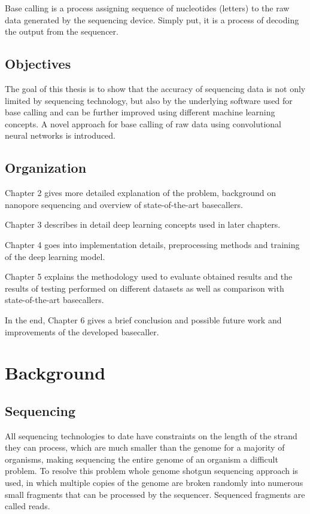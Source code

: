 \documentclass[times, utf8, diplomski, numeric, english]{fer}
\begin{document}
Base calling is a process assigning sequence of nucleotides (letters) to the raw data generated by the sequencing device. Simply put, it is a process of decoding the output from the sequencer.


\section{Objectives}
The goal of this thesis is to show that the accuracy of sequencing data is not only limited by sequencing technology, but also by the underlying software used for base calling and can be further improved using different machine learning concepts. A novel approach for base calling of raw data using convolutional neural networks is introduced.

\section{Organization}
\indent Chapter 2 gives more detailed explanation of the problem, background on nanopore sequencing and overview of state-of-the-art basecallers.

Chapter 3 describes in detail deep learning concepts used in later chapters.

Chapter 4 goes into implementation details, preprocessing methods and training of the deep learning model. 

Chapter 5 explains the methodology used to evaluate obtained results and the results of testing performed on different datasets as well as comparison with state-of-the-art basecallers.

In the end, Chapter 6 gives a brief conclusion and possible future work and improvements of the developed basecaller.

\chapter{Background}

\section{Sequencing}

All sequencing technologies to date have constraints on the length of the strand they can process, which are much smaller than the genome for a majority of organisms, making sequencing the entire genome of an organism a difficult problem. To resolve this problem whole genome shotgun sequencing approach is used, in which multiple copies of the genome are broken randomly into numerous small fragments that can be processed by the sequencer. Sequenced fragments are called reads.
\end{document}
